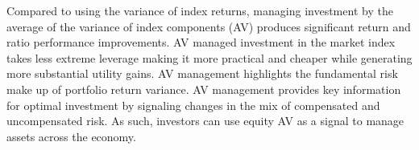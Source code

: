 \begin{doublespace}



\noindent Compared to using the variance of index returns, managing investment by the average of the variance of index components (AV) produces significant return and ratio performance improvements. AV managed investment in the market index takes less extreme leverage making it more practical and cheaper while generating more substantial utility gains. AV management highlights the fundamental risk make up of portfolio return variance. AV management provides key information for optimal investment by signaling changes in the mix of compensated and uncompensated risk. As such, investors can use equity AV as a signal to manage assets across the economy. 



\end{doublespace}